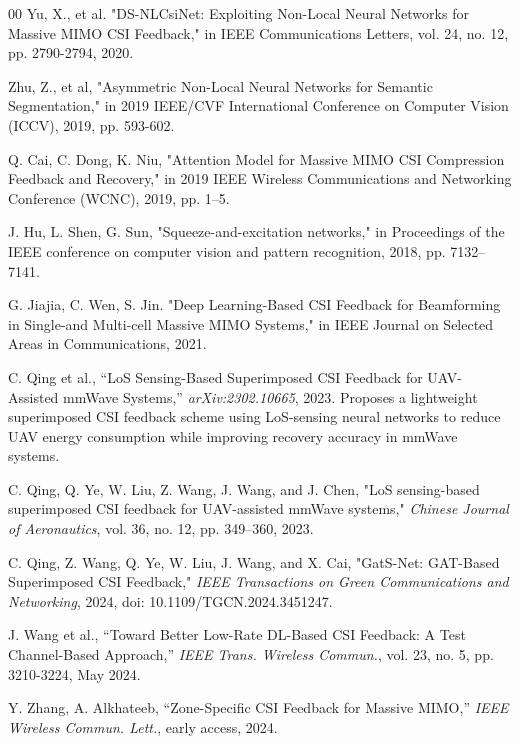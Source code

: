 \documentclass[lettersize,journal]{IEEEtran}
\begin{document}
\begin{thebibliography}{00}
    Yu, X., et al. "DS-NLCsiNet: Exploiting Non-Local Neural Networks for Massive MIMO CSI Feedback," in IEEE Communications Letters, vol. 24, no. 12, pp. 2790-2794, 2020.

    Zhu, Z., et al, "Asymmetric Non-Local Neural Networks for Semantic Segmentation," in 2019 IEEE/CVF International Conference on Computer Vision (ICCV), 2019, pp. 593-602.

    Q. Cai, C. Dong, K. Niu, "Attention Model for Massive MIMO CSI Compression Feedback and Recovery," in 2019 IEEE Wireless Communications and Networking Conference (WCNC), 2019, pp. 1–5.

    J. Hu, L. Shen, G. Sun, "Squeeze-and-excitation networks," in Proceedings of the IEEE conference on computer vision and pattern recognition, 2018, pp. 7132–7141.
	
	G. Jiajia, C. Wen, S. Jin. "Deep Learning-Based CSI Feedback for Beamforming in Single-and Multi-cell Massive MIMO Systems," in IEEE Journal on Selected Areas in Communications, 2021.

	C. Qing et al., ``LoS Sensing-Based Superimposed CSI Feedback for UAV-Assisted mmWave Systems,'' \textit{arXiv:2302.10665}, 2023.
	Proposes a lightweight superimposed CSI feedback scheme using LoS-sensing neural networks to reduce UAV energy consumption while improving recovery accuracy in mmWave systems.

	
	
	C. Qing, Q. Ye, W. Liu, Z. Wang, J. Wang, and J. Chen, 
	"LoS sensing-based superimposed CSI feedback for UAV-assisted mmWave systems," 
	\textit{Chinese Journal of Aeronautics}, 
	vol. 36, no. 12, pp. 349--360, 2023.
	
	C. Qing, Z. Wang, Q. Ye, W. Liu, J. Wang, and X. Cai,
	"GatS-Net: GAT-Based Superimposed CSI Feedback,"
	\textit{IEEE Transactions on Green Communications and Networking}, 
	2024, doi: 10.1109/TGCN.2024.3451247.
	
   	J. Wang et al., ``Toward Better Low-Rate DL-Based CSI Feedback: A Test Channel-Based Approach,'' \textit{IEEE Trans. Wireless Commun.}, vol. 23, no. 5, pp. 3210-3224, May 2024.

	Y. Zhang, A. Alkhateeb, ``Zone-Specific CSI Feedback for Massive MIMO,'' \textit{IEEE Wireless Commun. Lett.}, early access, 2024.



\end{thebibliography}
\end{document}
